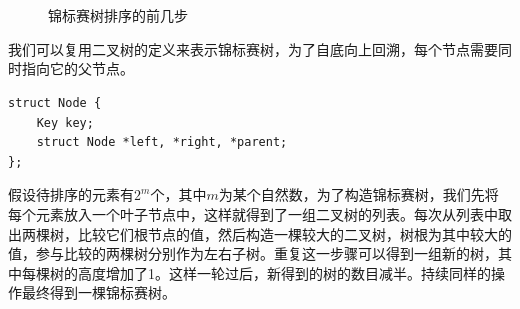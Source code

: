 \documentclass[b5paper]{ctexart}
\begin{document}
\captionsetup[subfigure]{labelformat=empty, margin=10pt}
\begin{figure}[htbp]
  \centering
   \\
   \\
  \caption{锦标赛树排序的前几步}
  \label{fig:tournament-tree-4}
\end{figure}
\captionsetup[subfigure]{labelformat=parens}

我们可以复用二叉树的定义来表示锦标赛树，为了自底向上回溯，每个节点需要同时指向它的父节点。

\lstset{language=C}
\begin{lstlisting}
struct Node {
    Key key;
    struct Node *left, *right, *parent;
};
\end{lstlisting}

假设待排序的元素有$2^m$个，其中$m$为某个自然数，为了构造锦标赛树，我们先将每个元素放入一个叶子节点中，这样就得到了一组二叉树的列表。每次从列表中取出两棵树，比较它们根节点的值，然后构造一棵较大的二叉树，树根为其中较大的值，参与比较的两棵树分别作为左右子树。重复这一步骤可以得到一组新的树，其中每棵树的高度增加了1。这样一轮过后，新得到的树的数目减半。持续同样的操作最终得到一棵锦标赛树。
\end{document}
